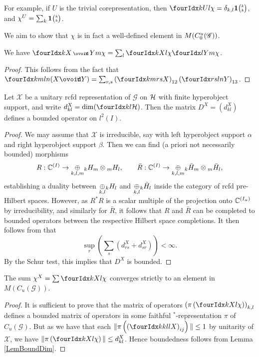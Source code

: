  For example, if $U$ is the trivial corepresentation, then $\Gr{\chi}{}{U}{k}{l} = \delta_{k,l}\UnitC{k}{k}$, and $\chi^U = \sum_k \UnitC{k}{k}$.
 
 We aim to show that $\chi$ is in fact a well-defined element in $M(\CuG)$. 
 
 \begin{Lem}\label{LemBoundDim} We have $\Gr{\chi}{}{X\smCirct Y}{k}{m}= \sum_l \Gr{\chi}{}{X}{k}{l}\Gr{\chi}{}{Y}{l}{m}$.
 \end{Lem}
 
 \begin{proof} 
 This follows from the fact that $\Gr{(X\Circt Y)}{k}{l}{m}{n} = \sum_{r,s} \left(\Gr{X}{k}{r}{m}{s}\right)_{12} \left(\Gr{Y}{r}{l}{s}{n}\right)_{13}$.
 \end{proof}
 
 \begin{Lem} Let $\mathscr{X}$ be a unitary rcfd representation of $\mathscr{G}$ on $\Hsp$ with finite hyperobject support, and write $d^X_{kl} = \dim(\Gru{\Hsp}{k}{l})$. Then the matrix $D^X = (d^X_{kl})$ defines a bounded operator on $l^2(I)$. 
  \end{Lem}
  \begin{proof} We may assume that $\mathscr{X}$ is irreducible, say with left hyperobject support $\alpha$ and right hyperobject support $\beta$. Then we can find (a priori not necessarily bounded) morphisms \[R: \C^{(I)}\rightarrow \underset{k,l,m}{\oplus} \GrDA{H}{k}{m}\otimes \GrDA{H}{m}{l},\qquad \bar{R}: \C^{(I)} \rightarrow   \underset{k,l,m}{\oplus} \GrDA{\bar{H}}{k}{m}\otimes \GrDA{\bar{H}}{m}{l},\] establishing a duality between $\underset{k,l}{\oplus} \GrDA{H}{k}{l}$ and $\underset{k,l}{\oplus}\GrDA{\bar{H}}{k}{l}$ inside the category of rcfd pre-Hilbert spaces. However, as $R^*R$ is a scalar multiple of the projection onto $\C^{(I_{\alpha})}$ by irreducibility, and similarly for $\bar{R}$, it follows that $R$ and $\bar{R}$ can be completed to bounded operators between the respective Hilbert space completions. It then follows from \cite[Lemma A.3.2]{DCY1} that \[\sup_r (\sum_s (d_{rs}^X+d_{sr}^X)) < \infty.\] By the Schur test, this implies that $D^X$ is bounded.
\end{proof} 
   
\begin{Cor} The sum $\chi^X  =\sum \Gr{\chi}{}{X}{k}{l}$ converges strictly to an element in $M(C_u(\mathscr{G}))$. 
\end{Cor} 
 
\begin{proof} It is sufficient to prove that the matrix of operators $\left(\pi\left(\Gr{\chi}{}{X}{k}{l}\right)\right)_{k,l}$ defines a bounded matrix of operators in some faithful $^*$-representation $\pi$ of $C_u(\mathscr{G})$. But as we have that each $\|\pi\left(\left(\Gr{X}{k}{l}{k}{l}\right)_{ij}\right)\|\leq 1$ by unitarity of $\mathscr{X}$, we have $\| \pi\left(\Gr{\chi}{}{X}{k}{l}\right)\| \leq d^X_{kl}$.  Hence boundedness follows from Lemma \ref{LemBoundDim}.
\end{proof} 
 
